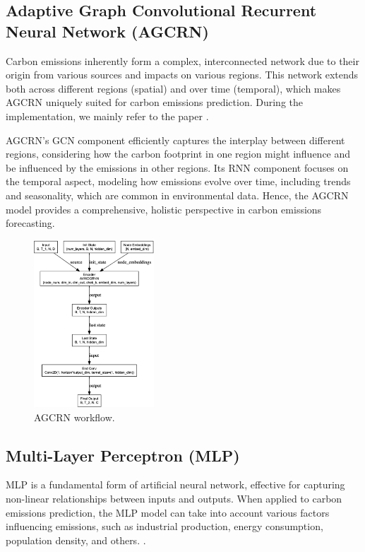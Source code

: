 \documentclass[sigconf, authordraft]{acmart}
\begin{document}
	\subsection{Adaptive Graph Convolutional Recurrent Neural Network (AGCRN)}


	Carbon emissions inherently form a complex, interconnected network due to their
	origin from various sources and impacts on various regions. This network
	extends both across different regions (spatial) and over time (temporal), which
	makes AGCRN uniquely suited for carbon emissions prediction. During the
	implementation, we mainly refer to the paper \cite{bai2020-adaptivea}.

	AGCRN's GCN component efficiently captures the interplay between different regions,
	considering how the carbon footprint in one region might influence and be
	influenced by the emissions in other regions. Its RNN component focuses on the
	temporal aspect, modeling how emissions evolve over time, including trends and
	seasonality, which are common in environmental data. Hence, the AGCRN model
	provides a comprehensive, holistic perspective in carbon emissions forecasting.

	\begin{figure}[ht]
		\centering
		\includegraphics[width=0.4\textwidth]{figures/AGCRN_flow.png}
		\caption{AGCRN workflow.}
		\label{fig:AGCRN_flow}
	\end{figure}

	\subsection{Multi-Layer Perceptron (MLP)}


	MLP is a fundamental form of artificial neural network, effective for capturing
	non-linear relationships between inputs and outputs. When applied to carbon
	emissions prediction, the MLP model can take into account various factors influencing
	emissions, such as industrial production, energy consumption, population
	density, and others. .
\end{document}
